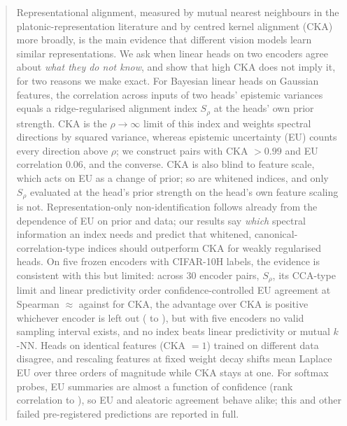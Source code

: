 \documentclass[twoside]{article}
\theoremstyle{definition}
\theoremstyle{remark}
\newcommand{\Srho}{S_{\rho}}
\begin{document}

\begin{abstract}
Representational alignment, measured by mutual nearest neighbours in the platonic-representation literature and by centred kernel alignment (CKA) more broadly, is the main evidence that different vision models learn similar representations.
We ask when linear heads on two encoders agree about \emph{what they do not know}, and show that high CKA does not imply it, for two reasons we make exact.
For Bayesian linear heads on Gaussian features, the correlation across inputs of two heads' epistemic variances equals a ridge-regularised alignment index $\Srho$ at the heads' own prior strength.
CKA is the $\rho\to\infty$ limit of this index and weights spectral directions by squared variance, whereas epistemic uncertainty (EU) counts every direction above $\rho$; we construct pairs with CKA $>0.99$ and EU correlation $0.06$, and the converse.
CKA is also blind to feature scale, which acts on EU as a change of prior; so are whitened indices, and only $\Srho$ evaluated at the head's prior strength on the head's own feature scaling is not.
Representation-only non-identification follows already from the dependence of EU on prior and data; our results say \emph{which} spectral information an index needs and predict that whitened, canonical-correlation-type indices should outperform CKA for weakly regularised heads.
On five frozen encoders with CIFAR-10H labels, the evidence is consistent with this but limited: across 30 encoder pairs, $\Srho$, its CCA-type limit and linear predictivity order confidence-controlled EU agreement at Spearman $\approx$\SrhoVsEUwidthPartial{} against \CKAVsEUwidthPartial{} for CKA, the advantage over CKA is positive whichever encoder is left out (\LOEOdiffCKAmin{} to \LOEOdiffCKAmax{}), but with five encoders no valid sampling interval exists, and no index beats linear predictivity or mutual $k$-NN.
Heads on identical features (CKA $=1$) trained on different data disagree, and rescaling features at fixed weight decay shifts mean Laplace EU over three orders of magnitude while CKA stays at one.
For softmax probes, EU summaries are almost a function of confidence (rank correlation \CorrWidthConfMin{} to \CorrWidthConfMax{}), so EU and aleatoric agreement behave alike; this and other failed pre-registered predictions are reported in full.
\end{abstract}
\end{document}
